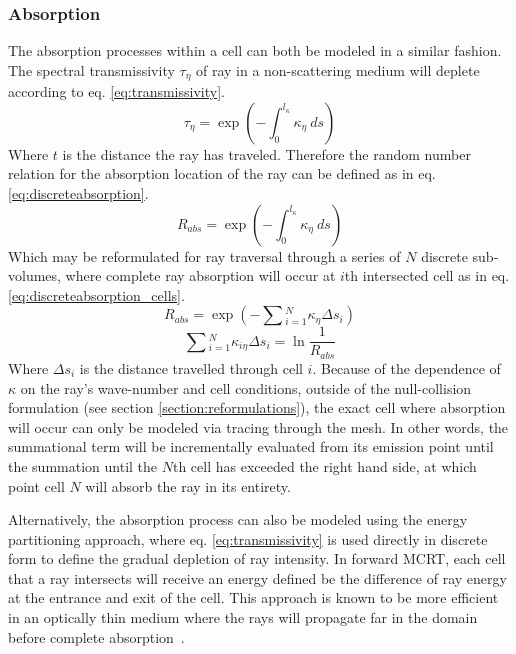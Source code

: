 \subsubsection{Absorption}
The absorption processes within a cell can both be modeled in a similar fashion. The spectral transmissivity $\tau{}_\eta{}$ of  ray in a non-scattering medium will deplete according to eq. \ref{eq:transmissivity}.
\begin{equation}
    \tau{}_\eta{}=\exp{\left(-\int^{l_\kappa{}}_0\kappa{}_\eta{}~ds\right)}
    \label{eq:transmissivity}
\end{equation}
Where $t$ is the distance the ray has traveled. Therefore the random number relation for the absorption location of the ray can be defined as in eq. \ref{eq:discreteabsorption}.
\begin{equation}
    R_{abs}=\exp{\left(-\int_0^{l_\kappa}\kappa_\eta{}~ds\right)}
    \label{eq:discreteabsorption}
\end{equation}
Which may be reformulated for ray traversal through a series of $N$ discrete sub-volumes, where complete ray absorption will occur at $i$th intersected cell as in eq. \ref{eq:discreteabsorption_cells}.
\begin{equation}
    R_{abs}=\exp{\left(-\sum{}_{i=1}^N\kappa_\eta{}\Delta{}s_i\right)}
\end{equation}
\begin{equation}
    \sum{}_{i=1}^N\kappa_{i\eta{}}\Delta{s_i}=\ln{\frac{1}{R_{abs}}}
    \label{eq:discreteabsorption_cells}
\end{equation}
Where $\Delta{s}_i$ is the distance travelled through cell $i$.
Because of the dependence of $\kappa{}$ on the ray's wave-number and cell conditions, outside of the null-collision formulation (see section \ref{section:reformulations}), the exact cell where absorption will occur can only be modeled via tracing through the mesh. In other words, the summational term will be incrementally evaluated from its emission point until the summation until the $N$th cell has exceeded the right hand side, at which point cell $N$ will absorb the ray in its entirety.

Alternatively, the absorption process can also be modeled using the energy partitioning approach, where eq. \ref{eq:transmissivity} is used directly in discrete form to define the gradual depletion of ray intensity. 
In forward MCRT, each cell that a ray intersects will receive an energy defined be the difference of ray energy at the entrance and exit of the cell.
This approach is known to be more efficient in an optically thin medium where the rays will propagate far in the domain before complete absorption~\cite{Modest2013RadiativeTransfer,Liu2020TheFlames}.

